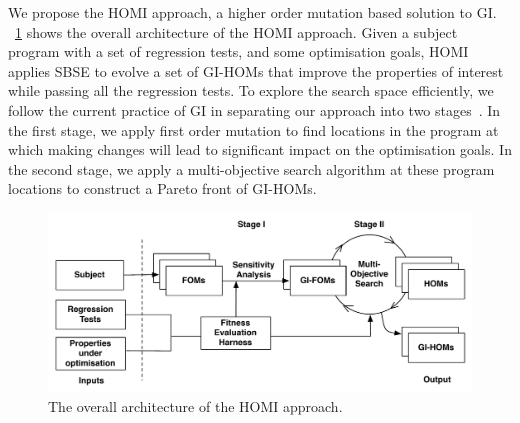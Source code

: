 \documentclass[oribibl]{llncs}
\begin{document}
We propose the HOMI approach, a higher order mutation based solution to GI. \figurename~\ref{fig_framework} shows the overall architecture of the HOMI approach. Given a subject program with a set of regression tests, and some optimisation goals, HOMI applies SBSE to evolve a set of GI-HOMs that improve the properties of interest while passing all the regression tests.  To explore the search space efficiently, we follow the current practice of GI in separating our approach into two stages~\cite{6733370}. In the first stage, we apply first order mutation to find locations in the program at which making changes will lead to significant impact on the optimisation goals. In the second stage, we apply a multi-objective search algorithm at these program locations to construct a Pareto front of GI-HOMs. 


\vspace{-5mm}

\begin{figure}[h]
\centering
\includegraphics[width=1.0\textwidth]{framework}
\caption{The overall architecture of the HOMI approach.}\label{fig_framework}
\end{figure}
\end{document}

